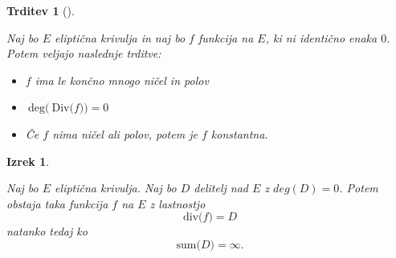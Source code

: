 \documentclass[12pt,a4paper,twoside]{article}
\theoremstyle{definition} %
\theoremstyle{plain} %
\newtheorem{izrek}[definicija]{Izrek}
\newtheorem{trditev}[definicija]{Trditev}
\numberwithin{equation}{section}  %
\newcommand{\DIV}[1]{\ \text{Div(}{#1}\text{)}}
\newcommand{\DEG}[1]{\ \text{deg(}{#1}\text{)}}
\newcommand{\Div}[1]{\ \text{div(}{#1}\text{)}}
\newcommand{\SUM}[1]{\ \text{sum(}{#1}\text{)}}
\begin{document}
\begin{trditev}[]~

\label{trditev 11.1}
Naj bo $E$ eliptična krivulja in naj bo $f$ funkcija na $E$, ki ni identično enaka $0$. Potem veljajo naslednje trditve:
\begin{itemize}

\item $f$ ima le končno mnogo ničel in polov
\item $\DEG{\DIV{f}}=0$
\item Če $f$ nima ničel ali polov, potem je $f$ konstantna.
\end{itemize}


\end{trditev}

\begin{izrek}~

\label{izrek 11.2}
Naj bo $E$ eliptična krivulja. Naj bo $D$ delitelj nad $E$ z $deg(D) = 0$. Potem obstaja taka funkcija $f$ na $E$ z lastnostjo
$$\Div{f} = D$$
natanko tedaj ko
$$\SUM{D} = \infty.$$

\end{izrek}
\end{document}
